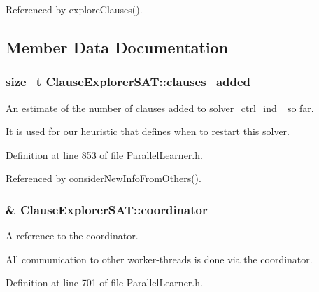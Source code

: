 Referenced by explore\-Clauses().



\subsection{Member Data Documentation}
\hypertarget{classClauseExplorerSAT_a03fe2cc565e5c1bc0f5093fb01ca57ba}{
\subsubsection[{clauses\-\_\-added\-\_\-}]{\setlength{\rightskip}{0pt plus 5cm}size\-\_\-t Clause\-Explorer\-S\-A\-T\-::clauses\-\_\-added\-\_\-\hspace{0.3cm}{\ttfamily [protected]}}}\label{classClauseExplorerSAT_a03fe2cc565e5c1bc0f5093fb01ca57ba}


An estimate of the number of clauses added to solver\-\_\-ctrl\-\_\-ind\-\_\- so far. 

It is used for our heuristic that defines when to restart this solver. 

Definition at line 853 of file Parallel\-Learner.\-h.



Referenced by consider\-New\-Info\-From\-Others().

\hypertarget{classClauseExplorerSAT_a8909bb332c60d7611763ca5976fbe6f6}{
\subsubsection[{coordinator\-\_\-}]{\& Clause\-Explorer\-S\-A\-T\-::coordinator\-\_\-\hspace{0.3cm}{\ttfamily [protected]}}}\label{classClauseExplorerSAT_a8909bb332c60d7611763ca5976fbe6f6}


A reference to the coordinator. 

All communication to other worker-\/threads is done via the coordinator. 

Definition at line 701 of file Parallel\-Learner.\-h.



